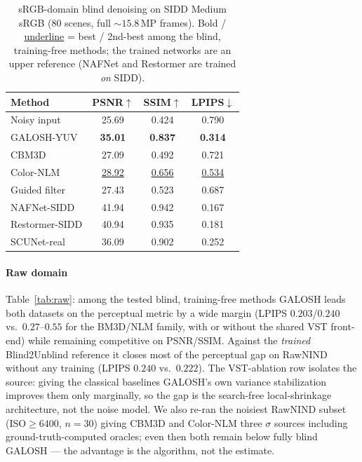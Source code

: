 \documentclass[journal]{IEEEtran}
\begin{document}
\begin{table}[t]
\centering
\caption{sRGB-domain blind denoising on SIDD Medium sRGB (80 scenes, full
${\sim}15.8$\,MP frames). Bold / \underline{underline} = best / 2nd-best among
the blind, training-free methods; the trained networks are an upper reference
(NAFNet and Restormer are trained \emph{on} SIDD).}
\label{tab:srgb}
\setlength{\tabcolsep}{4pt}
\footnotesize
\begin{tabular}{l ccc}
\toprule
Method & PSNR$\uparrow$ & SSIM$\uparrow$ & LPIPS$\downarrow$\\
\midrule
Noisy input     & 25.69 & 0.424 & 0.790\\
GALOSH-YUV      & \textbf{35.01} & \textbf{0.837} & \textbf{0.314}\\
CBM3D           & 27.09 & 0.492 & 0.721\\
Color-NLM       & \underline{28.92} & \underline{0.656} & \underline{0.534}\\
Guided filter   & 27.43 & 0.523 & 0.687\\
\midrule
NAFNet-SIDD     & 41.94 & 0.942 & 0.167\\
Restormer-SIDD  & 40.94 & 0.935 & 0.181\\
SCUNet-real     & 36.09 & 0.902 & 0.252\\
\bottomrule
\end{tabular}
\end{table}



\paragraph{Raw domain} Table~\ref{tab:raw}: among the tested blind,
training-free methods GALOSH leads both datasets on the perceptual metric by
a wide margin (LPIPS $0.203$/$0.240$ vs.\ $0.27$--$0.55$ for the BM3D/NLM
family, with or without the shared VST front-end) while remaining competitive
on PSNR/SSIM. Against the \emph{trained} Blind2Unblind reference it closes
most of the perceptual gap on RawNIND without any training (LPIPS $0.240$
vs.\ $0.222$). The VST-ablation row isolates the source: giving the classical
baselines GALOSH's own variance stabilization improves them only marginally,
so the gap is the search-free local-shrinkage architecture, not the noise
model. We also re-ran the noisiest RawNIND subset (ISO${\geq}6400$, $n{=}30$) giving
CBM3D and Color-NLM three $\sigma$ sources including ground-truth-computed
oracles; even then both remain below fully blind GALOSH --- the advantage is
the algorithm, not the estimate.
\end{document}
